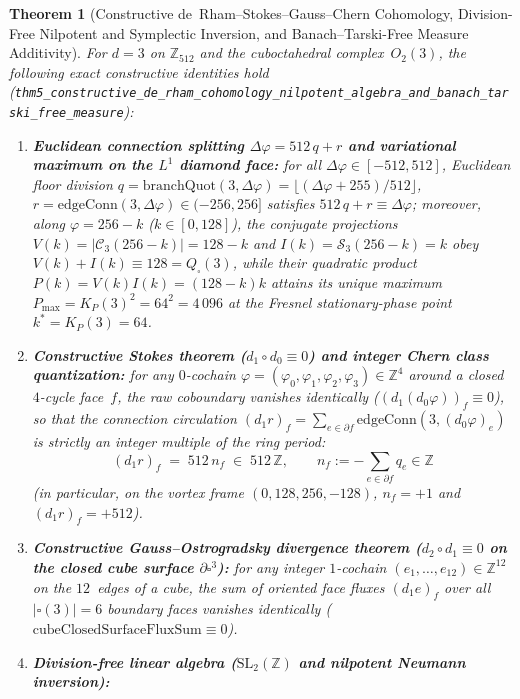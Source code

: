 \documentclass[11pt,a4paper]{article}
\theoremstyle{plain}
\newtheorem{theorem}{Theorem}[section]
\theoremstyle{definition}
\begin{document}
\begin{theorem}[Constructive de~Rham--Stokes--Gauss--Chern Cohomology, Division-Free Nilpotent and Symplectic Inversion, and Banach--Tarski-Free Measure Additivity]
\label{thm:main-5}
For $d=3$ on $\mathbb{Z}_{512}$ and the cuboctahedral complex~$O_2(3)$, the following exact constructive identities hold (\texttt{thm5\_constructive\_de\_rham\_cohomology\_nilpotent\_algebra\_and\_banach\_tarski\_free\_measure}):
\begin{enumerate}[label=\textbf{(\roman*)},leftmargin=*]
\item \textbf{Euclidean connection splitting $\Delta\varphi = 512\,q + r$ and variational maximum on the $L^1$ diamond face:}
  for all $\Delta\varphi\in[-512,512]$, Euclidean floor division $q = \mathrm{branchQuot}(3,\Delta\varphi) = \lfloor(\Delta\varphi+255)/512\rfloor$, $r = \mathrm{edgeConn}(3,\Delta\varphi)\in(-256,256]$ satisfies $512\,q + r \equiv \Delta\varphi$; moreover, along $\varphi = 256 - k$ ($k\in[0,128]$), the conjugate projections $V(k) = |\mathcal{C}_3(256-k)| = 128-k$ and $I(k) = \mathcal{S}_3(256-k) = k$ obey $V(k)+I(k)\equiv 128 = Q_\square(3)$, while their quadratic product $P(k) = V(k)I(k) = (128-k)k$ attains its unique maximum $P_{\max} = K_P(3)^2 = 64^2 = 4\,096$ at the Fresnel stationary-phase point $k^* = K_P(3) = 64$.
\item \textbf{Constructive Stokes theorem ($d_1\circ d_0\equiv 0$) and integer Chern class quantization:}
  for any $0$-cochain $\varphi = (\varphi_0,\varphi_1,\varphi_2,\varphi_3)\in\mathbb{Z}^4$ around a closed $4$-cycle face~$f$, the raw coboundary vanishes identically ($(d_1(d_0\varphi))_f \equiv 0$), so that the connection circulation $(d_1 r)_f = \sum_{e\in\partial f}\mathrm{edgeConn}(3,(d_0\varphi)_e)$ is strictly an integer multiple of the ring period:
  \[
    (d_1 r)_f \;=\; 512\,n_f \;\in\; 512\,\mathbb{Z},\qquad
    n_f := -\sum_{e\in\partial f} q_e \in \mathbb{Z}
  \]
  (in particular, on the vortex frame $(0,128,256,-128)$, $n_f = +1$ and $(d_1 r)_f = +512$).
\item \textbf{Constructive Gauss--Ostrogradsky divergence theorem ($d_2\circ d_1\equiv 0$ on the closed cube surface $\partial\square^3$):}
  for any integer $1$-cochain $(e_1,\dots,e_{12})\in\mathbb{Z}^{12}$ on the $12$~edges of a cube, the sum of oriented face fluxes $(d_1 e)_f$ over all $|\square(3)|=6$ boundary faces vanishes identically ($\mathrm{cubeClosedSurfaceFluxSum}\equiv 0$).
\item \textbf{Division-free linear algebra ($\mathrm{SL}_2(\mathbb{Z})$ and nilpotent Neumann inversion):}

\end{enumerate}
\end{theorem}
\end{document}
